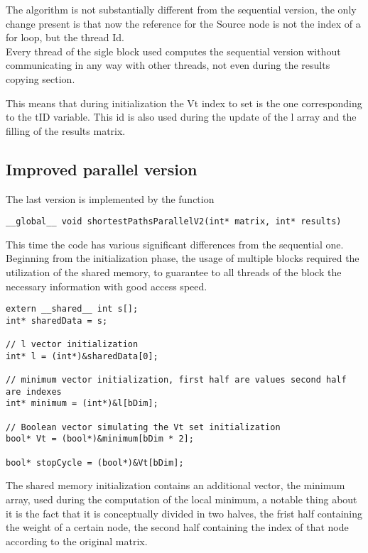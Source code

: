 \documentclass[
	a4paper, %
	12pt, %
]{class}
\begin{document}
The algorithm is not substantially different from the sequential version, the only change present is that now the reference for the
Source node is not the index of a for loop, but the thread Id.\\

Every thread of the sigle block used computes the sequential version without communicating in any way with other threads, not even during
the results copying section.

This means that during initialization the Vt index to set is the one corresponding to the tID variable. This id is also used during the
update of the l array and the filling of the results matrix.\\

\subsection{Improved parallel version}
The last version is implemented by the function
\begin{verbatim}
__global__ void shortestPathsParallelV2(int* matrix, int* results)
\end{verbatim}

This time the code has various significant differences from the sequential one.\\

Beginning from the initialization phase, the usage of multiple blocks required the utilization of the shared memory, to guarantee to all threads of the block
the necessary information with good access speed.
\begin{verbatim}
extern __shared__ int s[];
int* sharedData = s;

// l vector initialization
int* l = (int*)&sharedData[0];

// minimum vector initialization, first half are values second half are indexes
int* minimum = (int*)&l[bDim];

// Boolean vector simulating the Vt set initialization
bool* Vt = (bool*)&minimum[bDim * 2];

bool* stopCycle = (bool*)&Vt[bDim];
\end{verbatim}

The shared memory initialization contains an additional vector, the minimum array, used during the computation of the local minimum, a notable thing about it
is the fact that it is conceptually divided in two halves, the frist half containing the weight of a certain node, the second half containing the index of that node
according to the original matrix.\\
\end{document}
